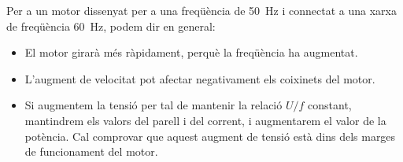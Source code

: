 Per a un motor dissenyat per a una freqüència de \qty{50}{Hz} i connectat a una xarxa de freqüència \qty{60}{Hz}, podem dir en general:
\begin{itemize}
	\item El motor girarà més ràpidament, perquè la freqüència ha augmentat.
	\item L'augment de velocitat pot  afectar negativament els coixinets  del motor.
	\item Si augmentem la tensió per tal de mantenir la relació $U/f$ constant, mantindrem els valors del parell i del corrent, i augmentarem el valor de la potència. Cal comprovar que aquest augment de tensió està dins dels marges de funcionament del motor.	
\end{itemize}